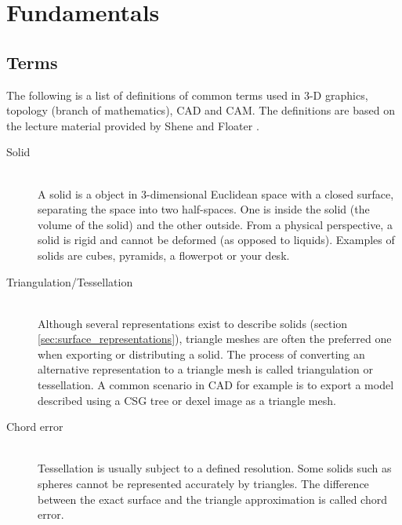 \chapter{Fundamentals} %
\label{ch:fundamentals}

\section{Terms}
\label{sec:definitions}

The following is a list of definitions of common terms used in 3-D graphics, topology (branch of mathematics), CAD and CAM. The definitions are based on the lecture material provided by Shene \cite{mesh_basics} and Floater \cite{mesh_lecture10}.

\begin{description}
	\item[Solid] \hfill \\
	A solid is a object in 3-dimensional Euclidean space with a closed surface, separating the space into two half-spaces.
	One is inside the solid (the volume of the solid) and the other outside.
	From a physical perspective, a solid is rigid and cannot be deformed (as opposed to \eg liquids).
	Examples of solids are cubes, pyramids, a flowerpot or your desk.
	
	\item[Triangulation/Tessellation] \hfill \\
	Although several representations exist to describe solids (\cf section \ref{sec:surface_representations}), triangle meshes are often the preferred one when exporting or distributing a solid.
	The process of converting an alternative representation to a triangle mesh is called triangulation or tessellation.
	A common scenario in CAD for example is to export a model described using a CSG tree or dexel image as a triangle mesh.
	
	
	\item[Chord error] \hfill \\
	Tessellation is usually subject to a defined resolution.
	Some solids such as spheres cannot be represented accurately by triangles.
	The difference between the exact surface and the triangle approximation is called chord error.
	

\end{description}
